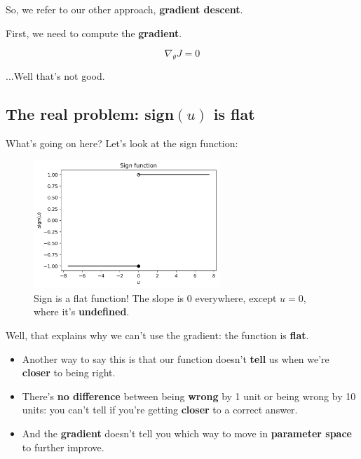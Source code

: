         So, we refer to our other approach, \textbf{gradient descent}.
        
        First, we need to compute the \textbf{gradient}.
        
        \begin{equation}
            \nabla_\theta J = 0
        \end{equation}
        
        ...Well that's not good.
        
    \subsection{The real problem: sign$(u)$ is flat}
    
        What's going on here? Let's look at the sign function:
        
        \begin{figure}[H]
            \centering
            
            \includegraphics[width=70mm,scale=0.5]{images/classification_images/sign_function.png}
            \caption*{Sign is a flat function! The slope is 0 everywhere, except $u=0$, where it's \textbf{undefined}.}
        \end{figure}
        
        Well, that explains why we can't use the gradient: the function is \textbf{flat}.

        \begin{itemize}
            \item Another way to say this is that our function doesn't \textbf{tell} us when we're \textbf{closer} to being right.
            
            \item There's \textbf{no difference} between being \textbf{wrong} by 1 unit or being wrong by 10 units: you can't tell if you're getting \textbf{closer} to a correct answer.
            
            \item And the \textbf{gradient} doesn't tell you which way to move in \textbf{parameter space} to further improve.
        \end{itemize}
        

